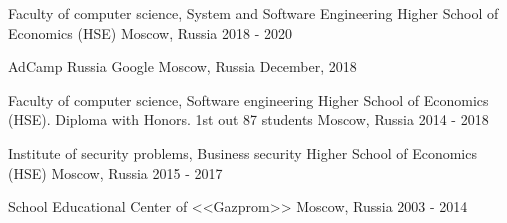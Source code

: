 

\cventryeducation
{Faculty of computer science, System and Software Engineering} %
{Higher School of Economics (HSE)} %
{Moscow, Russia} %
{2018 - 2020} %

\cventryeducation
{AdCamp Russia} %
{Google} %
{Moscow, Russia} %
{December, 2018} %

\cventryeducation
{Faculty of computer science, Software engineering} %
{Higher School of Economics (HSE). Diploma with Honors. 1st out 87 students} %
{Moscow, Russia} %
{2014 - 2018} %

\cventryeducation
{Institute of security problems, Business security} %
{Higher School of Economics (HSE)} %
{Moscow, Russia} %
{2015 - 2017} %

\cventryeducation
{School} %
{Educational Center of <<Gazprom>>} %
{Moscow, Russia} %
{2003 - 2014} %


